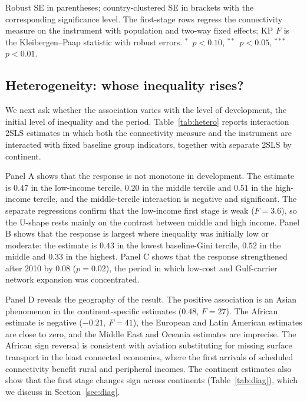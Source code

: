 \documentclass[12pt]{article}
\newcommand{\sym}[1]{\ensuremath{^{#1}}}
\begin{document}
\begin{table}[H]\centering\caption{Main results: OLS, first stage, and 2SLS, by connectivity measure.}\label{tab:main}
\begin{threeparttable}\small
\begin{tablenotes}\footnotesize\item Robust SE in parentheses; country-clustered SE in brackets with the corresponding significance level. The first-stage rows regress the connectivity measure on the instrument with population and two-way fixed effects; KP $F$ is the Kleibergen--Paap statistic with robust errors. \sym{*}~$p<0.10$, \sym{**}~$p<0.05$, \sym{***}~$p<0.01$.\end{tablenotes}\end{threeparttable}\end{table}

\subsection{Heterogeneity: whose inequality rises?}
\label{sec:hetero}
We next ask whether the association varies with the level of development, the initial level of inequality and the period. Table~\ref{tab:hetero} reports interaction 2SLS estimates in which both the connectivity measure and the instrument are interacted with fixed baseline group indicators, together with separate 2SLS by continent.

Panel A shows that the response is not monotone in development. The estimate is $0.47$ in the low-income tercile, $0.20$ in the middle tercile and $0.51$ in the high-income tercile, and the middle-tercile interaction is negative and significant. The separate regressions confirm that the low-income first stage is weak ($F=3.6$), so the U-shape rests mainly on the contrast between middle and high income. Panel B shows that the response is largest where inequality was initially low or moderate: the estimate is $0.43$ in the lowest baseline-Gini tercile, $0.52$ in the middle and $0.33$ in the highest. Panel C shows that the response strengthened after 2010 by $0.08$ ($p=0.02$), the period in which low-cost and Gulf-carrier network expansion was concentrated.

Panel D reveals the geography of the result. The positive association is an Asian phenomenon in the continent-specific estimates ($0.48$, $F=27$). The African estimate is negative ($-0.21$, $F=41$), the European and Latin American estimates are close to zero, and the Middle East and Oceania estimates are imprecise. The African sign reversal is consistent with aviation substituting for missing surface transport in the least connected economies, where the first arrivals of scheduled connectivity benefit rural and peripheral incomes. The continent estimates also show that the first stage changes sign across continents (Table~\ref{tab:diag}), which we discuss in Section~\ref{sec:diag}.
\end{document}
